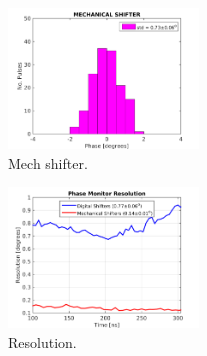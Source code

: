 \begin{figure}
  \centering
  \includegraphics[width=0.45\textwidth]{Figures/PhMon_HistMech}
  \caption{Mech shifter.}
  \label{f:PhMon_HistMech}
\end{figure}


\begin{figure}
  \centering
  \includegraphics[width=0.45\textwidth]{Figures/PhMon_Resolution}
  \caption{Resolution.}
  \label{f:PhMon_Resolution}
\end{figure}










